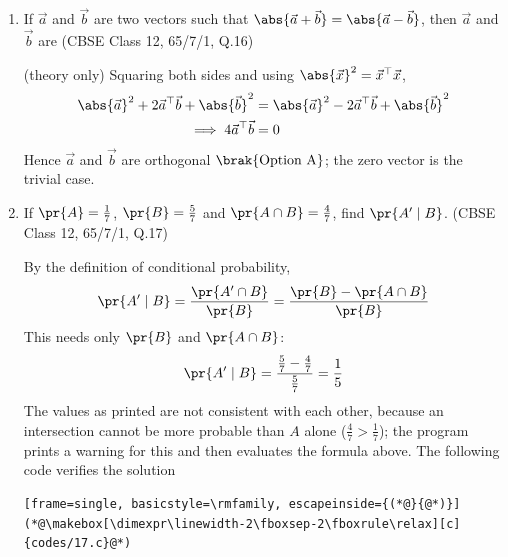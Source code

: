 \begin{enumerate}[label=\thesubsection.\arabic*, ref=\thesubsection.\theenumi]
\solution
Let $u = \frac{e^x}{2}$, so $du = \frac{e^x}{2}\,dx$ and $4 - e^{2x} = 4\brak{1 - u^2}$. Then
\begin{align}
	\int \frac{e^x\,dx}{\sqrt{4-e^{2x}}} = \int \frac{2\,du}{2\sqrt{1-u^2}} = \sin^{-1}u + C = \sin^{-1}\brak{\frac{e^x}{2}} + C \quad \brak{\text{Option D}}
\end{align}
valid for $e^{2x} < 4$, i.e.\ $x < \ln 2$. The program compares a midpoint Riemann sum over $\sbrak{-1, 0.5}$ with $F\brak{b} - F\brak{a}$. The following code verifies the solution
\begin{lstlisting}[frame=single, basicstyle=\rmfamily, escapeinside={(*@}{@*)}]
(*@\makebox[\dimexpr\linewidth-2\fboxsep-2\fboxrule\relax][c]{codes/14.py}@*)
\end{lstlisting}

\item
If $\vec{a}$ and $\vec{b}$ are two vectors such that $\abs{\vec{a}+\vec{b}} = \abs{\vec{a}-\vec{b}}$, then $\vec{a}$ and $\vec{b}$ are
\hfill (CBSE Class 12, 65/7/1, Q.16)

\solution
(theory only) Squaring both sides and using $\abs{\vec{x}}^2 = \vec{x}^{\top}\vec{x}$,
\begin{align}
	\abs{\vec{a}}^2 + 2\vec{a}^{\top}\vec{b} + \abs{\vec{b}}^2 &= \abs{\vec{a}}^2 - 2\vec{a}^{\top}\vec{b} + \abs{\vec{b}}^2
	\\
	\implies 4\vec{a}^{\top}\vec{b} &= 0
\end{align}
Hence $\vec{a}$ and $\vec{b}$ are orthogonal $\brak{\text{Option A}}$; the zero vector is the trivial case.

\item
If $\pr{A} = \frac{1}{7}$, $\pr{B} = \frac{5}{7}$ and $\pr{A \cap B} = \frac{4}{7}$, find $\pr{A^{\prime} \mid B}$.
\hfill (CBSE Class 12, 65/7/1, Q.17)

\solution
By the definition of conditional probability,
\begin{align}
	\pr{A^{\prime}\mid B} = \frac{\pr{A^{\prime}\cap B}}{\pr{B}} = \frac{\pr{B} - \pr{A\cap B}}{\pr{B}}
\end{align}
This needs only $\pr{B}$ and $\pr{A\cap B}$:
\begin{align}
	\pr{A^{\prime}\mid B} = \frac{\frac{5}{7} - \frac{4}{7}}{\frac{5}{7}} = \frac{1}{5}
\end{align}
The values as printed are not consistent with each other, because an intersection cannot be more probable than $A$ alone ($\frac{4}{7} > \frac{1}{7}$); the program prints a warning for this and then evaluates the formula above. The following code verifies the solution
\begin{lstlisting}[frame=single, basicstyle=\rmfamily, escapeinside={(*@}{@*)}]
(*@\makebox[\dimexpr\linewidth-2\fboxsep-2\fboxrule\relax][c]{codes/17.c}@*)
\end{lstlisting}


\end{enumerate}
